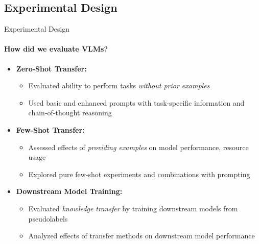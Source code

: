 \subsection{Experimental Design}
\begin{frame}{Experimental Design}
\framesubtitle{How did we evaluate VLMs?}
  \vspace{-1em}
  \begin{itemize}
    \item \textbf{Zero-Shot Transfer:}
    \begin{itemize}
      \item Evaluated ability to perform tasks \emph{without prior examples}
      \item Used basic and enhanced prompts with task-specific information and chain-of-thought reasoning
    \end{itemize}
    \item \textbf{Few-Shot Transfer:}
    \begin{itemize}
      \item Assessed effects of \emph{providing examples} on model performance, resource usage
      \item Explored pure few-shot experiments and combinations with prompting
    \end{itemize}
    \item \textbf{Downstream Model Training:}
    \begin{itemize}
      \item Evaluated \emph{knowledge transfer} by training downstream models from pseudolabels
      \item Analyzed effects of transfer methods on downstream model performance
    \end{itemize}
  \end{itemize}
\end{frame}


